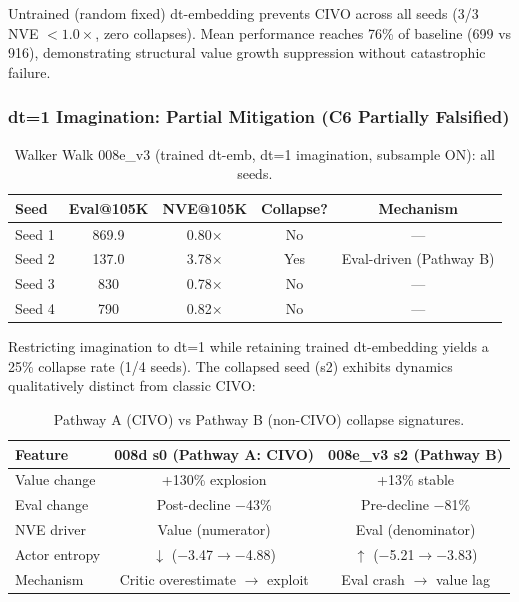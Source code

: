 \documentclass[10pt,letterpaper]{article}
\begin{document}
Untrained (random fixed) dt-embedding prevents CIVO across all seeds (3/3 NVE $< 1.0\times$, zero collapses). Mean performance reaches 76\% of baseline (699 vs 916), demonstrating structural value growth suppression without catastrophic failure.

\subsubsection{dt=1 Imagination: Partial Mitigation (C6 Partially Falsified)}

\begin{table}[h]
\centering
\caption{Walker Walk 008e\_v3 (trained dt-emb, dt=1 imagination, subsample ON): all seeds.}
\label{tab:008ev3_seeds}
\begin{tabular}{lcccc}
\toprule
Seed & Eval@105K & NVE@105K & Collapse? & Mechanism \\
\midrule
Seed 1 & 869.9 & 0.80$\times$ & No & --- \\
Seed 2 & 137.0 & 3.78$\times$ & Yes & Eval-driven (Pathway B) \\
Seed 3 & 830 & 0.78$\times$ & No & --- \\
Seed 4 & 790 & 0.82$\times$ & No & --- \\
\bottomrule
\end{tabular}
\end{table}

Restricting imagination to dt=1 while retaining trained dt-embedding yields a 25\% collapse rate (1/4 seeds). The collapsed seed (s2) exhibits dynamics qualitatively distinct from classic CIVO:

\begin{table}[h]
\centering
\caption{Pathway A (CIVO) vs Pathway B (non-CIVO) collapse signatures.}
\label{tab:pathways}
\begin{tabular}{lcc}
\toprule
Feature & 008d s0 (Pathway A: CIVO) & 008e\_v3 s2 (Pathway B) \\
\midrule
Value change & +130\% explosion & +13\% stable \\
Eval change & Post-decline $-$43\% & Pre-decline $-$81\% \\
NVE driver & Value (numerator) & Eval (denominator) \\
Actor entropy & $\downarrow$ ($-$3.47$\rightarrow$$-$4.88) & $\uparrow$ ($-$5.21$\rightarrow$$-$3.83) \\
Mechanism & Critic overestimate $\rightarrow$ exploit & Eval crash $\rightarrow$ value lag \\
\bottomrule
\end{tabular}
\end{table}
\end{document}
